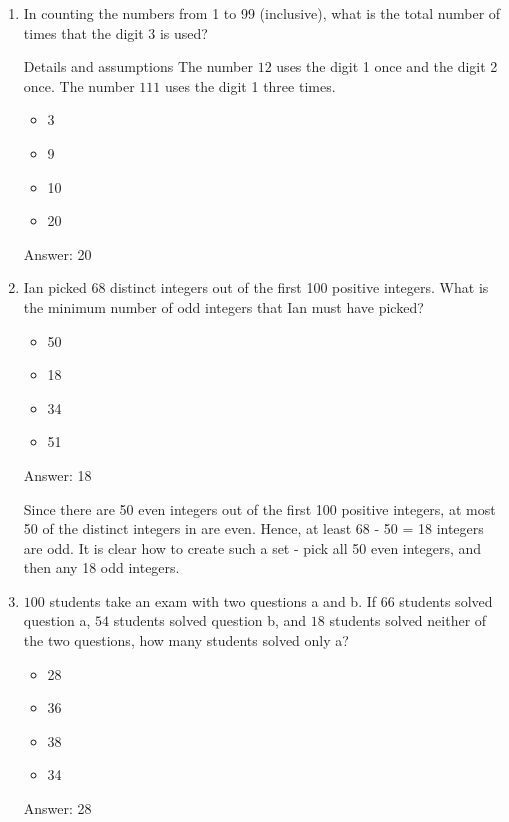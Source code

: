 \documentclass{article}
\begin{document}
\begin{enumerate}
    \item In counting the numbers from 1 to 99 (inclusive), what is the total number of times that the digit 3 is used?

    Details and assumptions 
    The number $12$ uses the digit 1 once and the digit 2 once. 
    The number $111$ uses the digit 1 three times.

    \begin{itemize}
        \item 3
        \item 9
        \item 10
        \item 20
    \end{itemize}
     
     Answer: 20
     
     \item Ian picked 68 distinct integers out of the first 100 positive integers. What is the minimum number of odd integers that Ian must have picked?
     
     \begin{itemize}
         \item 50
         \item 18
         \item 34
         \item 51
     \end{itemize}
     
     Answer: 18
     
    Since there are 50 even integers out of the first 100 positive integers, at most 50 of the distinct integers in  are even. Hence, at least 68 - 50 = 18 integers are odd. It is clear how to create such a set - pick all 50 even integers, and then any 18 odd integers.
    
    \item  \(100\) students take an exam with two questions a and b. If  \(66\) students solved question a,  \(54\) students solved question b, and  \(18\) students solved neither of the two questions, how many students solved only a?
    
    \begin{itemize}
        \item 28
        \item 36
        \item 38
        \item 34
    \end{itemize}
    
    Answer: 28
    

\end{enumerate}
\end{document}
